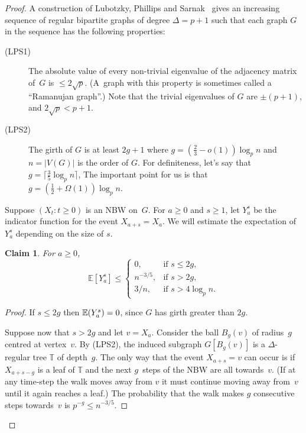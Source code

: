 \documentclass[11pt,a4paper]{article}
\theoremstyle{plain}
\newtheorem{claim}[theorem]{Claim}
\newcommand{\Exp}{\mathop{\null\mathbb{E}}}
\begin{document}
\begin{proof} 
A construction of Lubotzky, Phillips and Sarnak~\cite{LPS} gives an increasing sequence of regular bipartite graphs of degree $\Delta=p+1$ such that each graph $G$ in the sequence has the following properties:  
\begin{description}
\item[\rm(LPS1)] The absolute value of every non-trivial eigenvalue of the adjacency matrix of~$G$ is $\leq2\sqrt p$.  (A~graph with this property is sometimes called a ``Ramanujan graph''.)  
Note that the trivial eigenvalues of $G$ are $\pm(p+1)$, and $2 \sqrt p < p+1$.

\item[\rm(LPS2)] The girth of $G$ is at least $2g+1$ where $g=(\frac23-o(1))\log_p n$ and $n=|V(G)|$ is the order of $G$.  For definiteness, let's say that $g=\lceil\frac35\log_p n\rceil$,  The important point for us is that $g=(\frac12+\Omega(1))\log_p n$.
\end{description}





	
Suppose $(X_t:t\geq 0)$ is an NBW on~$G$.  For  $a\geq0$ and $s\geq1$, let $Y_a^s$ be the indicator function for the event $X_{a+s}=X_a$.  We will estimate the expectation of~$Y_a^s$ depending on the size of $s$. 

\begin{claim}
For $a\geq 0$,
\[
\mathbb{E}\left[Y_a^s\right]
\le
\begin{cases}
0,
& \text{if } s\le 2g,\\
n^{-3/5},
& \text{if } s>2g,\\
3/n,
& \text{if } s> 4\log_p n.
\end{cases}
\]
\end{claim}
\begin{proof}
If $s\leq 2g$ then $\Exp(Y_a^s)=0$, since $G$ has girth greater than $2g$.

Suppose now that $s>2g$ and let $v=X_a$.  Consider the ball $B_g(v)$ of radius~$g$ centred at vertex~$v$.  By (LPS2), the induced subgraph $G[B_g(v)]$ is a $\Delta$-regular tree $\mathbb T$ of depth~$g$.  The only way that the event $X_{a+s}=v$ can occur is if $X_{a+s-g}$ is a leaf of $\mathbb T$ and the next $g$~steps of the NBW are all towards~$v$.  (If at any time-step the walk moves away from $v$ it must continue moving away from~$v$ until it again reaches a leaf.)  The probability that the walk makes $g$ consecutive steps towards~$v$ is $p^{-g}\leq n^{-3/5}$.


\end{proof}
\end{proof}
\end{document}
